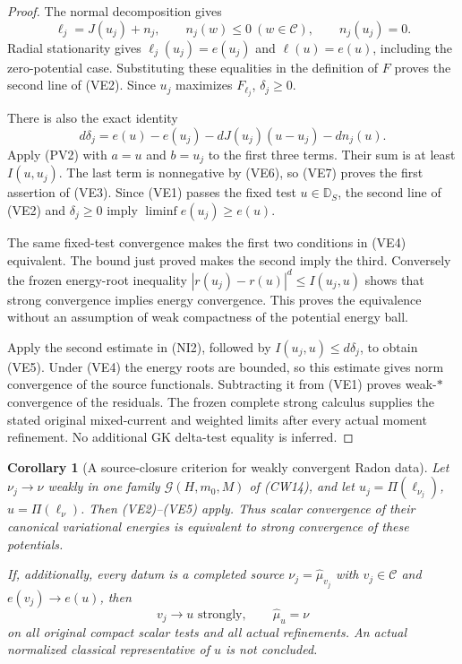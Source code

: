 \documentclass[11pt,a4paper]{article}
\numberwithin{equation}{section}
\newtheorem{corollary}[theorem]{Corollary}
\theoremstyle{definition}
\theoremstyle{remark}
\begin{document}
\begin{proof}
The normal decomposition gives
\[
      \ell_j=J(u_j)+n_j,\qquad
      n_j(w)\leq0\ (w\in\mathscr C),\qquad n_j(u_j)=0.
 \tag{VE6}
\]
Radial stationarity gives
$\ell_j(u_j)=e(u_j)$ and $\ell(u)=e(u)$, including
the zero-potential case. Substituting these equalities
in the definition of $F$ proves the second line of
(VE2). Since $u_j$ maximizes $F_{\ell_j}$, $\delta_j\geq0$.

There is also the exact identity
\[
 d\delta_j
    =e(u)-e(u_j)-dJ(u_j)(u-u_j)-d n_j(u).
 \tag{VE7}
\]
Apply (PV2) with $a=u$ and $b=u_j$ to the first three
terms. Their sum is at least $I(u,u_j)$. The last
term is nonnegative by (VE6), so (VE7) proves the
first assertion of (VE3). Since (VE1) passes the
fixed test $u\in\mathbb D_S$, the second line of
(VE2) and $\delta_j\geq0$ imply
$\liminf e(u_j)\geq e(u)$.

The same fixed-test convergence makes the first two
conditions in (VE4) equivalent. The bound just proved
makes the second imply the third. Conversely the
frozen energy-root inequality
$|r(u_j)-r(u)|^d\leq I(u_j,u)$ shows that strong
convergence implies energy convergence. This proves
the equivalence without an assumption of weak
compactness of the potential energy ball.

Apply the second estimate in (NI2), followed by
$I(u_j,u)\leq d\delta_j$, to obtain (VE5).
Under (VE4) the energy roots are bounded, so this
estimate gives norm convergence of the source
functionals. Subtracting it from (VE1) proves
weak-$*$ convergence of the residuals. The frozen
complete strong calculus supplies the stated original
mixed-current and weighted limits after every actual
moment refinement. No additional GK delta-test
equality is inferred.
\end{proof}

\begin{corollary}[A source-closure criterion for weakly convergent Radon data]
\label{cor:r12-weak-measure-energy-source-closure}
Let $\nu_j\to\nu$ weakly in one family
$\mathcal G(H,m_0,M)$ of (CW14), and let
$u_j=\Pi(\ell_{\nu_j})$, $u=\Pi(\ell_\nu)$.
Then (VE2)--(VE5) apply. Thus scalar convergence of
their canonical variational energies is equivalent
to strong convergence of these potentials.

If, additionally, every datum is a completed source
$\nu_j=\widehat\mu_{v_j}$ with $v_j\in\mathscr C$
and $e(v_j)\to e(u)$, then
\[
             v_j\longrightarrow u\text{ strongly},
                         \qquad\widehat\mu_u=\nu
 \tag{VE8}
\]
on all original compact scalar tests and all actual
refinements. An actual normalized classical
representative of $u$ is not concluded.
\end{corollary}
\end{document}
